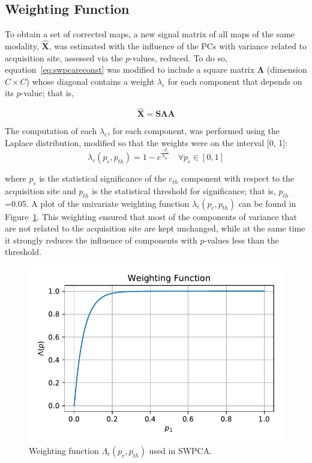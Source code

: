 \subsection{Weighting Function}
To obtain a set of corrected maps, a new signal matrix of all maps of the same modality,  $\widehat{\mathbf{X}}$, was estimated with the influence of the PCs with variance related to acquisition site, assessed via the $p$-values, reduced. To do so, equation~\ref{eq:swpcareconst} was modified to include a square matrix $\boldsymbol\Lambda$ (dimension $C\times C$) whose diagonal contains a weight ${\lambda }_{c}$ for each component that depends on its $p$-value; that is,

\begin{equation}
	\widehat{\mathbf{X}} = \mathbf{S}\boldsymbol{\Lambda}\mathbf{A}
\end{equation}

The computation of each ${\lambda }_{c}$, for each component, was performed using the Laplace distribution, modified so that the weights were on the interval [0, 1]:
\begin{equation}
	\lambda_{c}(p_c, p_{th}) = 1-e^{\frac{-p_c}{p_{th}}} \quad \forall p_c \in \left[0,1\right]
\end{equation}

where  ${p}_{c}$ is the statistical significance of the $c_{th}$ component with respect to the acquisition site and ${p}_{th}$ is the statistical threshold for significance; that is,  ${p}_{th}$=0.05. A plot of the univariate weighting function $\lambda_c(p_c,p_{th})$ can be found in Figure~\ref{fig:swpcasweigthing}. This weighting ensured that most of the components of variance that are not related to the acquisition site are kept unchanged, while at the same time it strongly reduces the influence of components with $p$-values less than the threshold. 

\begin{figure}
	\centering
	\includegraphics[width=0.6\linewidth]{Graphics/ch7/weighting2}
	\caption[Weighting function $\Lambda_c(p_c,p_{th})$ used in \acs{SWPCA}.]{Weighting function $\Lambda_c(p_c,p_{th})$ used in \ac{SWPCA}.}
	\label{fig:swpcasweigthing}
\end{figure}

